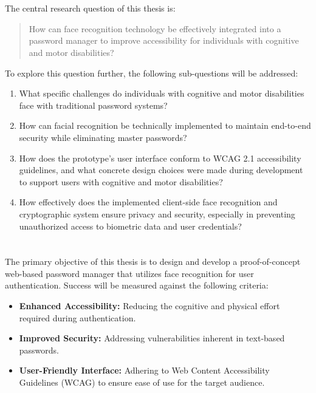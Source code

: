 \clearpage

\section{}%
\label{sec:onderzoeksvraag}

The central research question of this thesis is:
\begin{quote}
How can face recognition technology be effectively integrated into a password manager to improve accessibility for individuals with cognitive and motor disabilities?
\end{quote}

To explore this question further, the following sub-questions will be addressed:
\begin{enumerate}
  \item\label{sq:challenges} What specific challenges do individuals with cognitive and motor disabilities face with traditional password systems?
  \item\label{sq:implementation} How can facial recognition be technically implemented to maintain end-to-end security while eliminating master passwords?
  \item\label{sq:accessibility} How does the prototype’s user interface conform to WCAG 2.1 accessibility guidelines, and what concrete design choices were made during development to support users with cognitive and motor disabilities?
  \item\label{sq:security} How effectively does the implemented client-side face recognition and cryptographic system ensure privacy and security, especially in preventing unauthorized access to biometric data and user credentials?
\end{enumerate}

\section{}%
\label{sec:onderzoeksdoelstelling}

The primary objective of this thesis is to design and develop a proof-of-concept web-based password manager that utilizes face recognition for user authentication. Success will be measured against the following criteria:
\begin{itemize}
  \item \textbf{Enhanced Accessibility:} Reducing the cognitive and physical effort required during authentication.
  \item \textbf{Improved Security:} Addressing vulnerabilities inherent in text-based passwords.
  \item \textbf{User-Friendly Interface:} Adhering to Web Content Accessibility Guidelines (WCAG) to ensure ease of use for the target audience.
\end{itemize}

